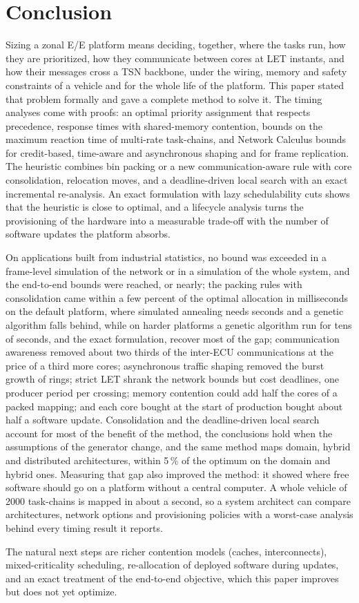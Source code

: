 \section{Conclusion}
\label{sec:conclusion}

Sizing a zonal E/E platform means deciding, together, where the tasks run,
how they are prioritized, how they communicate between cores at LET instants, and how their
messages cross a TSN backbone, under the wiring, memory and safety
constraints of a vehicle and for the whole life of the platform. This
paper stated that problem formally and gave a complete method to solve it.
The timing analyses come with proofs: an optimal priority assignment that
respects precedence, response times with shared-memory contention, bounds
on the maximum reaction time of multi-rate task-chains, and Network
Calculus bounds for credit-based, time-aware and asynchronous shaping and
for frame replication. The heuristic combines bin packing or a new
communication-aware rule with core consolidation, relocation moves, and a
deadline-driven local search with an exact incremental re-analysis. An exact formulation with lazy schedulability cuts shows that
the heuristic is close to optimal, and a lifecycle analysis turns the
provisioning of the hardware into a measurable trade-off with the number
of software updates the platform absorbs.

On applications built from industrial statistics, no bound was exceeded
in a frame-level simulation of the network or in a simulation of the
whole system, and the end-to-end bounds were reached, or nearly; the
packing rules with consolidation came within a few percent of the
optimal allocation in milliseconds on the default platform, where
simulated annealing needs seconds and a genetic algorithm falls behind,
while on harder platforms a genetic algorithm run for tens of seconds,
and the exact formulation, recover most of the gap; communication awareness removed
about two thirds of the inter-ECU communications at the price of a third
more cores; asynchronous traffic shaping removed the burst growth of rings;
strict LET shrank the network bounds but cost deadlines, one producer
period per crossing;
memory contention could add half the cores of a packed mapping; and each
core bought at the start of production bought about half a software
update. Consolidation and the deadline-driven local search account for
most of the benefit of the method, the conclusions hold
when the assumptions of the generator change, and the same method maps
domain, hybrid and distributed architectures, within 5\,\% of the
optimum on the domain and hybrid ones. Measuring that gap also improved
the method: it showed where free software should go on a platform
without a central computer. A whole vehicle of 2000
task-chains is mapped in about a second, so a system architect can compare
architectures, network options and provisioning policies with a
worst-case analysis behind every timing result it reports.

The natural next steps are richer contention models (caches,
interconnects), mixed-criticality scheduling, re-allocation of deployed
software during updates, and an exact treatment of the end-to-end
objective, which this paper improves but does not yet optimize.
